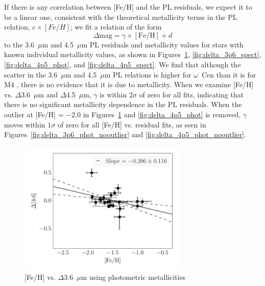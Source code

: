 \documentclass[a4paper,fleqn,usenatbib]{mnras}
\begin{document}
If there is any correlation between [Fe/H] and the PL residuals, we expect it to be a linear one, consistent with the theoretical metallicity terms in the PL relation, $c\times[Fe/H]$; we fit a relation of the form
\begin{equation}
\Delta\text{mag} = \gamma \times[\text{Fe/H}] + d
\end{equation}
to the 3.6~$\mu$m and 4.5~$\mu$m PL residuals and metallicity values for stars with known individual metallicity values, as shown in Figures~\ref{fig:delta_3p6_phot}, \ref{fig:delta_3p6_spect}, \ref{fig:delta_4p5_phot}, and \ref{fig:delta_4p5_spect}. We find that although the scatter in the 3.6~$\mu$m and 4.5~$\mu$m PL relations is higher for $\omega$~Cen than it is for M4 \citep{2015arXiv150507858N, 2015ApJ...799..165B}, there is no evidence that it is due to metallicity. When we examine [Fe/H] vs. $\Delta$3.6~$\mu$m and $\Delta$4.5~$\mu$m, $\gamma$ is within $2\sigma$ of zero for all fits, indicating that there is no significant metallicity dependence in the PL residuals. When the outlier at [Fe/H] = $-2.0$ in Figures~\ref{fig:delta_3p6_phot} and \ref{fig:delta_4p5_phot} is removed, $\gamma$ moves within $1\sigma$ of zero for all [Fe/H] vs. residual fits, as seen in Figures~\ref{fig:delta_3p6_phot_nooutlier} and \ref{fig:delta_4p5_phot_nooutlier}.


\begin{figure}
\begin{center}
\includegraphics[width=80mm]{final_plots/delta_feh_3p6_phot.pdf}
\caption{[Fe/H] vs. $\Delta$3.6~$\mu$m using photometric metallicities}
\label{fig:delta_3p6_phot}
\end{center}
\end{figure}
\end{document}
